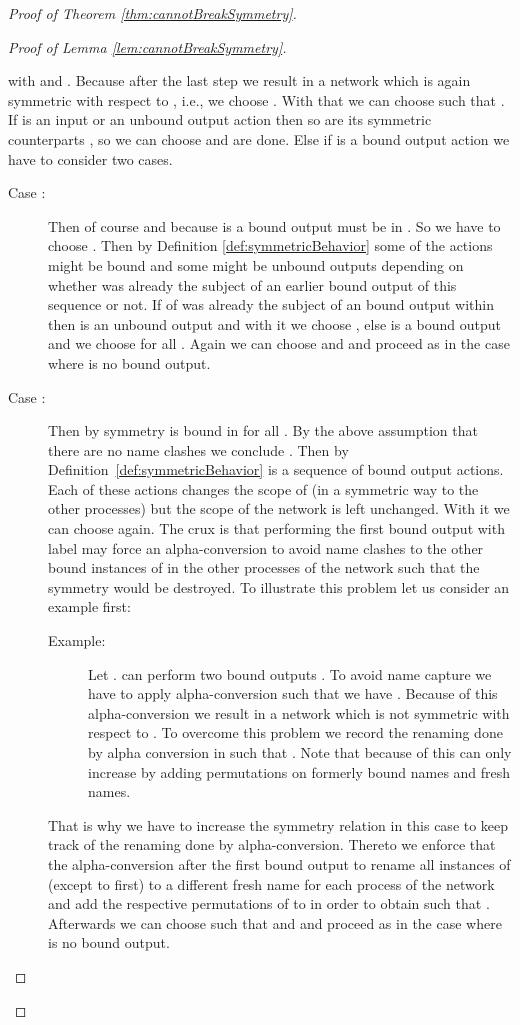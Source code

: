 \documentclass[11pt,techReport]{eptcs}
\begin{document}
\begin{proof}[Proof of Theorem \ref{thm:cannotBreakSymmetry}]
\begin{proof}[Proof of Lemma \ref{lem:cannotBreakSymmetry}]
\begin{description}
			with  and . Because  after the last step we result in a network which is again symmetric with respect to , i.e., we choose . With that we can choose  such that . If  is an input or an unbound output action then so are its symmetric counterparts , so we can choose  and are done. Else if  is a bound output action  we have to consider two cases.
			\begin{description}
				\item[Case :] Then of course  and because  is a bound output  must be in . So we have to choose . Then by Definition \ref{def:symmetricBehavior} some of the actions  might be bound and some might be unbound outputs depending on whether  was already the subject of an earlier bound output of this sequence or not. If  of  was already the subject of an bound output within  then  is an unbound output and with it we choose , else  is a bound output and we choose  for all . Again we can choose  and  and proceed as in the case where  is no bound output.
				\item[Case :] Then by symmetry  is bound in  for all . By the above assumption that there are no name clashes we conclude . Then by Definition~\ref{def:symmetricBehavior}  is a sequence of  bound output actions. Each of these actions  changes the scope of  (in a symmetric way to the other processes) but the scope of the network is left unchanged. With it we can choose  again. The crux is that performing the first bound output with label  may force an alpha-conversion to avoid name clashes to the other bound instances of  in the other processes of the network such that the symmetry would be destroyed. To illustrate this problem let us consider an example first:
				\begin{description}
					\item[Example:] Let .  can perform two bound outputs . To avoid name capture we have to apply alpha-conversion such that we have . Because of this alpha-conversion we result in a network which is not symmetric with respect to . To overcome this problem we record the renaming done by alpha conversion in  such that . Note that because of this  can only increase by adding permutations on formerly bound names and fresh names.
				\end{description}
				That is why we have to increase the symmetry relation in this case to keep track of the renaming done by alpha-conversion. Thereto we enforce that the alpha-conversion after the first bound output to rename all instances of  (except to first) to a different fresh name for each process of the network and add the respective permutations of  to  in order to obtain  such that . Afterwards we can choose  such that  and  and proceed as in the case where  is no bound output.

\end{description}
\end{description}
\end{proof}
\end{proof}
\end{document}
